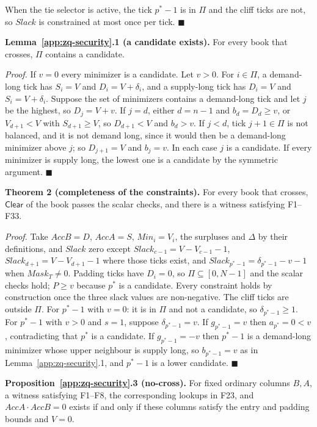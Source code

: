When the tie selector is active, the tick \(p^* - 1\) is in \(\Pi\) and the cliff ticks are not, so \(Slack\) is constrained at most once per tick. \(\blacksquare\)

\textbf{Lemma~\ref{app:zq-security}.1 (a candidate exists).} For every book that crosses, \(\Pi\) contains a candidate.

\emph{Proof.} If \(v = 0\) every minimizer is a candidate. Let \(v > 0\). For \(i \in \Pi\), a demand-long tick has \(S_i = V\) and \(D_i = V + \delta_i\), and a supply-long tick has \(D_i = V\) and \(S_i = V + \delta_i\). Suppose the set of minimizers contains a demand-long tick and let \(j\) be the highest, so \(D_j = V + v\). If \(j = d\), either \(d = n - 1\) and \(b_d = D_d \ge v\), or \(V_{d+1} < V\) with \(S_{d+1} \ge V\), so \(D_{d+1} < V\) and \(b_d > v\). If \(j < d\), tick \(j + 1 \in \Pi\) is not balanced, and it is not demand long, since it would then be a demand-long minimizer above \(j\); so \(D_{j+1} = V\) and \(b_j = v\). In each case \(j\) is a candidate. If every minimizer is supply long, the lowest one is a candidate by the symmetric argument. \(\blacksquare\)

\textbf{Theorem 2 (completeness of the constraints).} For every book that crosses, \(\mathsf{Clear}\) of the book passes the scalar checks, and there is a witness satisfying F1--F33.

\emph{Proof.} Take \(AccB = D\), \(AccA = S\), \(Min_i = V_i\), the surpluses and \(\Delta\) by their definitions, and \(Slack\) zero except \(Slack_{c-1} = V - V_{c-1} - 1\), \(Slack_{d+1} = V - V_{d+1} - 1\) where those ticks exist, and \(Slack_{p^*-1} = \delta_{p^*-1} - v - 1\) when \(Mask_T \ne 0\). Padding ticks have \(D_i = 0\), so \(\Pi \subseteq [0, N-1]\) and the scalar checks hold; \(P \ge v\) because \(p^*\) is a candidate. Every constraint holds by construction once the three slack values are non-negative. The cliff ticks are outside \(\Pi\). For \(p^* - 1\) with \(v = 0\): it is in \(\Pi\) and not a candidate, so \(\delta_{p^*-1} \ge 1\). For \(p^* - 1\) with \(v > 0\) and \(s = 1\), suppose \(\delta_{p^*-1} = v\). If \(g_{p^*-1} = v\) then \(a_{p^*} = 0 < v\), contradicting that \(p^*\) is a candidate. If \(g_{p^*-1} = -v\) then \(p^* - 1\) is a demand-long minimizer whose upper neighbour is supply long, so \(b_{p^*-1} = v\) as in Lemma~\ref{app:zq-security}.1, and \(p^* - 1\) is a lower candidate. \(\blacksquare\)

\textbf{Proposition~\ref{app:zq-security}.3 (no-cross).} For fixed ordinary columns \(B,A\), a witness satisfying F1--F8, the corresponding lookups in F23, and \(AccA \cdot AccB = 0\) exists if and only if these columns satisfy the entry and padding bounds and \(V=0\).


